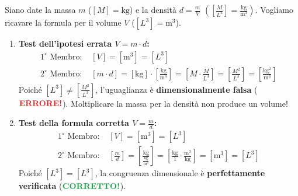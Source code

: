 \documentclass[11pt,a4paper,oneside]{report}
\begin{document}
\begin{metodo}[Verifica Comparativa della Formula del Volume: $V = m \cdot d$ vs $V = \frac{m}{d}$]
Siano date la massa $m$ ($[M] = \mathrm{kg}$) e la densit\`a $d = \frac{m}{V}$ $\left(\left[\frac{M}{L^3}\right] = \frac{\mathrm{kg}}{\mathrm{m}^3}\right)$. Vogliamo ricavare la formula per il volume $V$ ($[L^3] = \mathrm{m}^3$).

\begin{enumerate}[leftmargin=2em]
    \item \textbf{Test dell'ipotesi errata $V = m \cdot d$:}
    \begin{align}
        1^\circ\text{ Membro: } & [V] = [\mathrm{m}^3] = [L^3] \\
        2^\circ\text{ Membro: } & [m \cdot d] = [\mathrm{kg}] \cdot \left[\frac{\mathrm{kg}}{\mathrm{m}^3}\right] = \left[M \cdot \frac{M}{L^3}\right] = \left[\frac{M^2}{L^3}\right] = \left[\frac{\mathrm{kg}^2}{\mathrm{m}^3}\right]
    \end{align}
    Poich\'e $[L^3] \neq \left[\frac{M^2}{L^3}\right]$, l'uguaglianza \`e \textbf{dimensionalmente falsa} ($\text{\textcolor{accentRed}{\textbf{ERRORE!}}}$). Moltiplicare la massa per la densit\`a non produce un volume!
    
    \item \textbf{Test della formula corretta $V = \frac{m}{d}$:}
    \begin{align}
        1^\circ\text{ Membro: } & [V] = [\mathrm{m}^3] = [L^3] \\
        2^\circ\text{ Membro: } & \left[\frac{m}{d}\right] = \left[\frac{\mathrm{kg}}{\frac{\mathrm{kg}}{\mathrm{m}^3}}\right] = \left[\frac{\mathrm{kg}}{1} \cdot \frac{\mathrm{m}^3}{\mathrm{kg}}\right] = [\mathrm{m}^3] = [L^3]
    \end{align}
    Poich\'e $[L^3] = [L^3]$, la congruenza dimensionale \`e \textbf{perfettamente verificata} ($\text{\textcolor{accentGreen}{\textbf{CORRETTO!}}}$).
\end{enumerate}
\end{metodo}
\end{document}
